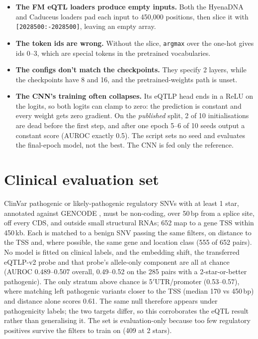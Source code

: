 \begin{itemize}
\item \textbf{The FM eQTL loaders produce empty inputs.} Both the HyenaDNA and
Caduceus loaders pad each input to 450,000 positions, then slice it with
\texttt{[2028500:-2028500]}, leaving an empty array.
\item \textbf{The token ids are wrong.} Without the slice, \texttt{argmax} over
the one-hot gives ids 0--3, which are special tokens in the pretrained
vocabularies.
\item \textbf{The configs don't match the checkpoints.} They specify 2 layers,
while the checkpoints have 8 and 16, and the pretrained-weights path is unset.
\item \textbf{The CNN's training often collapses.} Its eQTLP head ends in a ReLU
on the logits, so both logits can clamp to zero: the prediction is constant and
every weight gets zero gradient. On the \emph{published} split, 2 of 10
initialisations are dead before the first step, and after one epoch 5--6 of 10
seeds output a constant score (AUROC exactly 0.5). The script sets no seed and
evaluates the final-epoch model, not the best. The CNN is fed only the reference.
\end{itemize}

\section{Clinical evaluation set}

\ifdefined\RECOMB
ClinVar \citep{landrum2025clinvar} pathogenic or likely-pathogenic regulatory
SNVs with at least 1 star, annotated against GENCODE \citep{gencode2025}, must be
non-coding, over 50\,bp from a splice site, off every CDS, and outside small
structural RNAs; 652 map to a gene TSS within 450\,kb. Each is matched to a
benign SNV passing the same filters, on distance to the TSS and, where possible,
the same gene and location class (555 of 652 pairs). No model is fitted on
clinical labels, and the embedding shift, the transferred eQTLP-v2 probe and that
probe's allele-only component are all at chance (AUROC 0.489--0.507 overall,
0.49--0.52 on the 285 pairs with a 2-star-or-better pathogenic). The only stratum
above chance is 5$'$UTR/promoter (0.53--0.57), where matching left pathogenic
variants closer to the TSS (median 170 vs 450\,bp) and distance alone scores
0.61. The same null therefore appears under pathogenicity labels; the two targets
differ, so this corroborates the eQTL result rather than generalising it. The set
is evaluation-only because too few regulatory positives survive the filters to
train on (409 at 2 stars).

